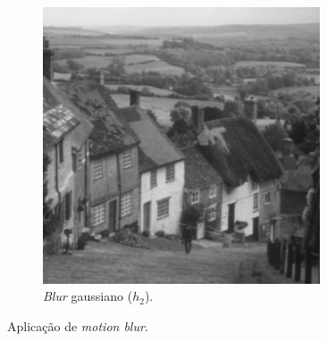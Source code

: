 \begin{figure}[H]
\begin{subfigure}{0.48\textwidth}
        \includegraphics[width=0.9\textwidth]{resultados/city_h2.png}
        \caption{\textit{Blur} gaussiano (\hyperref[sec:blur]{$h_2$}).}
    \end{subfigure}

    \caption{Aplicação de \textit{motion blur}.}
\end{figure}
